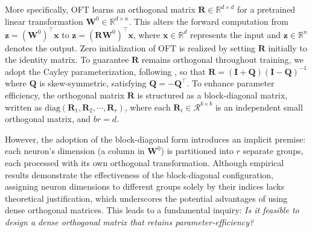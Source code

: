 More specifically, OFT learns an orthogonal matrix $\bm{R} \in \mathbb{R}^{d\times d}$ for a pretrained linear transformation $\bm{W}^0\in\mathbb{R}^{d\times n}$. This alters the forward computation from $\bm{z} = (\bm{W}^0)^\top\bm{x}$ to $\bm{z} = (\bm{R}\bm{W}^0)^\top\bm{x}$, where $\bm{x}\in\mathbb{R}^{d}$ represents the input and $\bm{z}\in\mathbb{R}^{n}$ denotes the output. Zero initialization of OFT is realized by setting $\bm{R}$ initially to the identity matrix. To guarantee $\bm{R}$ remains orthogonal throughout training, we adopt the Cayley parameterization, following \cite{qiu2023controlling,liu2021orthogonal}, so that $\bm{R} = (\bm{I} + \bm{Q})(\bm{I} - \bm{Q})^{-1}$ where $\bm{Q}$ is skew-symmetric, satisfying $\bm{Q} = -\bm{Q}^\top$. To enhance parameter efficiency, the orthogonal matrix $\bm{R}$ is structured as a block-diagonal matrix, written as $\text{diag}(\bm{R}_1, \bm{R}_2, \cdots, \bm{R}_r)$, where each $\bm{R}_i\in\mathcal{R}^{b\times b}$ is an independent small orthogonal matrix, and $br=d$.

However, the adoption of the block-diagonal form introduces an implicit premise: each neuron's dimension (a column in $\bm{W}^0$) is partitioned into $r$ separate groups, each processed with its own orthogonal transformation. Although empirical results demonstrate the effectiveness of the block-diagonal configuration, assigning neuron dimensions to different groups solely by their indices lacks theoretical justification, which underscores the potential advantages of using dense orthogonal matrices. This leads to a fundamental inquiry: \emph{Is it feasible to design a dense orthogonal matrix that retains parameter-efficiency?}

